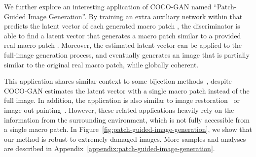 \documentclass{article}
\newcommand{\modelName}{COCO-GAN }
\begin{document}
        We further explore an interesting application of \modelName named ``Patch-Guided Image Generation''. By training an extra auxiliary network  within  that predicts the latent vector of each generated macro patch , the discriminator is able to find a latent vector  that generates a macro patch similar to a provided real macro patch . Moreover, the estimated latent vector  can be applied to the full-image generation process, and eventually generates an image that is partially similar to the original real macro patch, while globally coherent. 
        
        This application shares similar context to some bijection methods~\cite{ali,bigan,BEGAN-CS}, despite \modelName estimates the latent vector with a single macro patch instead of the full image. In addition, the application is also similar to image restoration~\cite{partial-conv,inpaintingC,inpaintingB} or image out-painting~\cite{out-painting}. However, these related applications heavily rely on the information from the surrounding environment, which is not fully accessible from a single macro patch. In Figure~\ref{fig:patch-guided-image-generation}, we show that our method is robust to extremely damaged images. More samples and analyses are described in Appendix~\ref{appendix:patch-guided-image-generation}.
        
\end{document}
